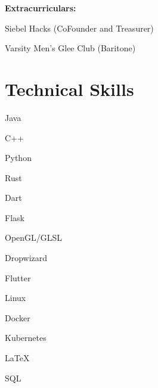 \documentclass[hidelinks,11pt]{extarticle}
\begin{document}
\textbf{Extracurriculars:} 
\begin{citemize*}
    \item[] Siebel Hacks (CoFounder and Treasurer) 
    \item Varsity Men's Glee Club (Baritone)
\end{citemize*}

\section{Technical Skills}
{
    \item[] Java 
    \item C++ 
    \item Python 
    \item Rust
    \item Dart
}

{
    \item[] Flask
    \item OpenGL/GLSL
    \item Dropwizard
    \item Flutter
}

{
    \item[] Linux
    \item Docker
    \item Kubernetes
    \item \LaTeX
    \item SQL
}

\vfill
{\color{mycolor}\titlerule}
\end{document}
